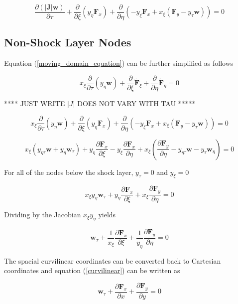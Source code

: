 \documentclass[10pt]{article}
\begin{document}
	 \begin{equation} \label{moving_domain_equation}
	 	\frac{\partial (|\mathbf{J}| \mathbf{w})}{\partial \tau} 
	 	+ \frac{\partial}{\partial \xi} (y_\eta \mathbf{F}_x) 
	 	+ \frac{\partial}{\partial \eta} (-y_\xi \mathbf{F}_x + x_\xi (\mathbf{F}_y - y_\tau \mathbf{w})) 
	 	= 0
	 \end{equation} 
	 
	 \subsection{Non-Shock Layer Nodes}
	 
	 Equation (\ref{moving_domain_equation}) can be further simplified as follows
	 
	 $$ x_\xi \frac{\partial}{\partial \tau} \left( y_\eta \mathbf{w} \right) + \frac{\partial}{\partial \xi} \tilde{\mathbf{F}}_\xi + \frac{\partial}{\partial \eta} \tilde{\mathbf{F}}_\eta = 0 $$
	 
	 **** JUST WRITE $|J|$ DOES NOT VARY WITH TAU *****
	 
	 $$ x_\xi \frac{\partial}{\partial \tau} \left( y_\eta \mathbf{w} \right) + \frac{\partial}{\partial \xi} (y_\eta \mathbf{F}_x) + \frac{\partial}{\partial \eta} (-y_\xi \mathbf{F}_x + x_\xi (\mathbf{F}_y - y_\tau \mathbf{w})) = 0$$
	 
	 $$ x_\xi (y_{\eta \tau} \mathbf{w} + y_\eta \mathbf{w}_\tau) + y_\eta \frac{\partial \mathbf{F}_x}{\partial \xi} - y_\xi \frac{\partial \mathbf{F}_x}{\partial \eta} + x_\xi \left(\frac{\partial \mathbf{F}_y}{\partial \eta} - y_{\eta \tau} \mathbf{w} - y_\tau \mathbf{w}_\eta \right) = 0$$
	 
	 For all of the nodes below the shock layer, $y_{\tau} = 0$ and $y_{\xi} = 0$
	 
	 $$ x_\xi y_\eta \mathbf{w}_\tau + y_\eta \frac{\partial \mathbf{F}_x}{\partial \xi} + x_\xi \frac{\partial \mathbf{F}_y}{\partial \eta} = 0 $$
	 
	 Dividing by the Jacobian $x_\xi y_\eta$ yields
	 
	 $$ \mathbf{w}_\tau + \frac{1}{x_\xi} \frac{\partial \mathbf{F}_x}{\partial \xi} + \frac{1}{y_\eta} \frac{\partial \mathbf{F}_y}{\partial \eta} = 0 $$
	 
	 The spacial curvilinear coordinates can be converted back to Cartesian coordinates and equation (\ref{curvilinear}) can be written as
	 
	 $$	\mathbf{w}_\tau + \frac{\partial \mathbf{F}_x}{\partial x} + \frac{\partial \mathbf{F}_y}{\partial y} = 0 $$
	 
\end{document}
